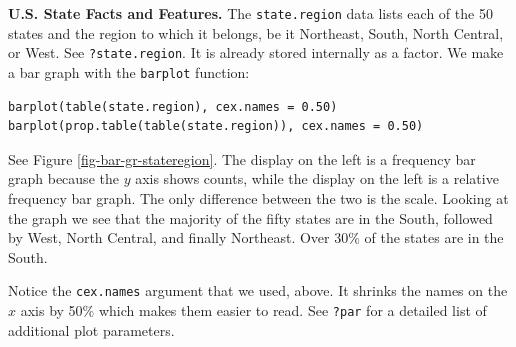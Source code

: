 \documentclass[captions=tableheading]{scrbook}
\begin{document}
\begin{example}
\textbf{U.S. State Facts and Features.} The \texttt{state.region} data lists each of the 50 states and the region to which it belongs, be it Northeast, South, North Central, or West. See \texttt{?state.region}. It is already stored internally as a factor. We make a bar graph with the \texttt{barplot} function: 



\lstset{language=R}
\begin{lstlisting}
barplot(table(state.region), cex.names = 0.50)
barplot(prop.table(table(state.region)), cex.names = 0.50)
\end{lstlisting}

See Figure \ref{fig-bar-gr-stateregion}. The display on the left is a frequency bar graph because the \(y\) axis shows counts, while the display on the left is a relative frequency bar graph. The only difference between the two is the scale. Looking at the graph we see that the majority of the fifty states are in the South, followed by West, North Central, and finally Northeast. Over 30\% of the states are in the South.

Notice the \texttt{cex.names} argument that we used, above. It shrinks the names on the \(x\) axis by 50\% which makes them easier to read. See \texttt{?par} for a detailed list of additional plot parameters.








\end{example}
\end{document}

